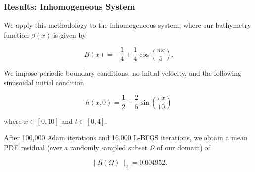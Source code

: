 \begin{frame}
    \frametitle{Results: Inhomogeneous System}

    We apply this methodology to the inhomogeneous system, where our bathymetry function 
    $\beta(x)$ is given by

    $$
    B(x) = -\frac{1}{4} + \frac{1}{4} \cos{\left( \frac{\pi x}{5} \right)}.
    $$
    
    We impose periodic boundary conditions, no initial velocity, and the following sinusoidal initial condition

    $$
    h(x, 0) = \frac{1}{2} + \frac{2}{5} \sin{\left( \frac{\pi x}{10} \right)}
    $$

    where $x \in [0, 10]$ and $t \in [0, 4]$.

    \medskip
    \pause

    After 100,000 Adam iterations and 16,000 L-BFGS iterations, we obtain a mean PDE residual (over a randomly sampled 
    subset $\Omega$ of our domain) of 
    
    $$
    \lVert R(\Omega) \rVert_2 = 0.004952.
    $$
\end{frame}